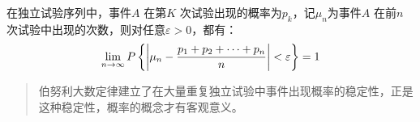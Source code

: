 \begin{theorem}[泊松大数定律]
    在独立试验序列中，事件\(A\) 在第\(K\) 次试验出现的概率为\(p_{k}\)，记\(\mu_{n}\)为事件\(A\)
    在前\(n\) 次试验中出现的次数，则对任意\(\varepsilon>0\)，都有：
    \[
        \lim_{n \to \infty} P\left\{\left|\mu_{n} - \frac{p_{1}+p_{2}+\dots
        +p_{n}}{n}\right| < \varepsilon\right\} = 1
    \]
\end{theorem}

\begin{quote}
    伯努利大数定律建立了在大量重复独立试验中事件出现概率的稳定性，正是这种稳定性，概率的概念才有客观意义。
\end{quote}


